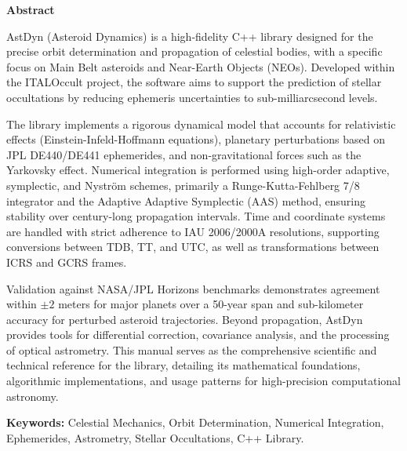 \clearpage
\thispagestyle{plain}

\begin{center}
    {\Large\bfseries Abstract}
\end{center}
\vspace{1cm}

\noindent
AstDyn (Asteroid Dynamics) is a high-fidelity C++ library designed for the precise orbit determination and propagation of celestial bodies, with a specific focus on Main Belt asteroids and Near-Earth Objects (NEOs). Developed within the ITALOccult project, the software aims to support the prediction of stellar occultations by reducing ephemeris uncertainties to sub-milliarcsecond levels.

The library implements a rigorous dynamical model that accounts for relativistic effects (Einstein-Infeld-Hoffmann equations), planetary perturbations based on JPL DE440/DE441 ephemerides, and non-gravitational forces such as the Yarkovsky effect. Numerical integration is performed using high-order adaptive, symplectic, and Nystr\"om schemes, primarily a Runge-Kutta-Fehlberg 7/8 integrator and the Adaptive Adaptive Symplectic (AAS) method, ensuring stability over century-long propagation intervals. Time and coordinate systems are handled with strict adherence to IAU 2006/2000A resolutions, supporting conversions between TDB, TT, and UTC, as well as transformations between ICRS and GCRS frames.

Validation against NASA/JPL Horizons benchmarks demonstrates agreement within $\pm 2$ meters for major planets over a 50-year span and sub-kilometer accuracy for perturbed asteroid trajectories. Beyond propagation, AstDyn provides tools for differential correction, covariance analysis, and the processing of optical astrometry. This manual serves as the comprehensive scientific and technical reference for the library, detailing its mathematical foundations, algorithmic implementations, and usage patterns for high-precision computational astronomy.

\vspace{1cm}
\noindent
\textbf{Keywords:} Celestial Mechanics, Orbit Determination, Numerical Integration, Ephemerides, Astrometry, Stellar Occultations, C++ Library.
